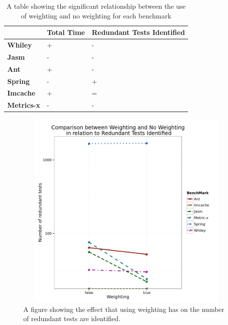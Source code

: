 \documentclass[11pt
              , a4paper
              , twoside
              , openright
              ]{report}
\begin{document}
\begin{table}[h]
\centering


\begin{tabular}{|l|l|l|}
\hline
{\bf }          & {\bf Total Time} & {\bf Redundant Tests Identified} \\ \hline
{\bf Whiley}    & +                & -                           \\ \hline
{\bf Jasm}      & -                & -                           \\ \hline
{\bf Ant}       & +                & -                           \\ \hline
{\bf Spring}    & -                & +                           \\ \hline
{\bf Imcache}   & +                & =                           \\ \hline
{\bf Metrics-x} & -                & -                           \\ \hline
\end{tabular}
\caption{A table showing the significant relationship between the use of weighting and no weighting for each benchmark}
\label{weightingsig}
\end{table}


\begin{figure}[h]
\begin{center}
\includegraphics[height=10cm, width = 14.5cm]{Weighting.png}
\end{center}
\caption{A figure showing the effect that using weighting has on the number of redundant tests are identified.}
\label{fig:weightgraph}
\end{figure}
\end{document}
